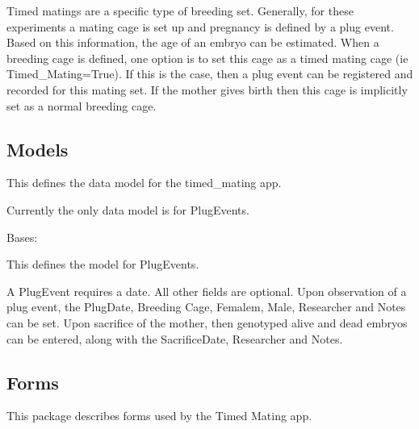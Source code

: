 \documentclass[letterpaper,10pt,english]{sphinxmanual}
\begin{document}
Timed matings are a specific type of breeding set.  
Generally, for these experiments a mating cage is set up and pregnancy is defined by a plug event.  
Based on this information, the age of an embryo can be estimated.  
When a breeding cage is defined, one option is to set this cage as a timed mating cage (ie Timed\_Mating=True).  
If this is the case, then a plug event can be registered and recorded for this mating set.  
If the mother gives birth then this cage is implicitly set as a normal breeding cage.


\subsection{Models}
\label{api:id6}\label{api:module-timed_mating.models}
This defines the data model for the timed\_mating app.

Currently the only data model is for PlugEvents.

\begin{fulllineitems}
\label{api:timed_mating.models.PlugEvents}
Bases: 

This defines the model for PlugEvents.

A PlugEvent requires a date.  All other fields are optional.
Upon observation of a plug event, the PlugDate, Breeding Cage, Femalem, Male, Researcher and Notes can be set.
Upon sacrifice of the mother, then genotyped alive and dead embryos can be entered, along with the SacrificeDate, Researcher and Notes.

\end{fulllineitems}



\subsection{Forms}
\label{api:id7}\label{api:module-timed_mating.forms}
This package describes forms used by the Timed Mating app.
\end{document}
